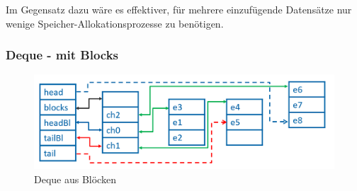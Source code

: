 \documentclass{TUBAFarbeiten}
\begin{document}
Im Gegensatz dazu wäre es effektiver, für mehrere einzufügende Datensätze nur wenige Speicher-Allokationsprozesse zu benötigen.
\subsubsection{Deque - mit Blocks}
\begin{figure}
\includegraphics[scale=0.38]{deque-dyn}
\caption{Deque aus Blöcken}
\label{fig:Img3}
\end{figure}
\end{document}
